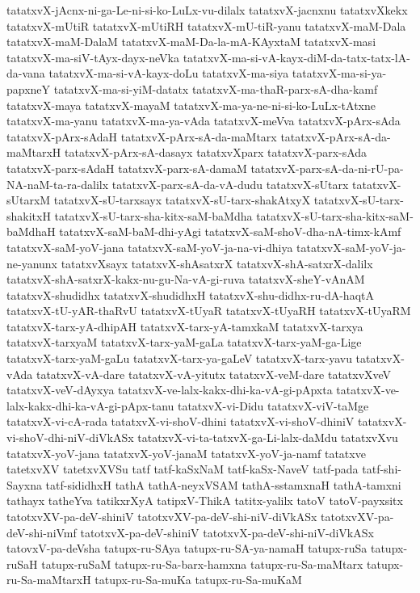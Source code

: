 {tatatxvX-jAcnx-ni-ga-Le-ni-si-ko-LuLx-vu-dilalx
tatatxvX-jacnxnu
tatatxvXkekx
tatatxvX-mUtiR
tatatxvX-mUtiRH
tatatxvX-mU-tiR-yanu
tatatxvX-maM-Dala
tatatxvX-maM-DalaM
tatatxvX-maM-Da-la-mA-KAyxtaM
tatatxvX-masi
tatatxvX-ma-siV-tAyx-dayx-neVka
tatatxvX-ma-si-vA-kayx-diM-da-tatx-tatx-lA-da-vana
tatatxvX-ma-si-vA-kayx-doLu
tatatxvX-ma-siya
tatatxvX-ma-si-ya-papxneY
tatatxvX-ma-si-yiM-datatx
tatatxvX-ma-thaR-parx-sA-dha-kamf
tatatxvX-maya
tatatxvX-mayaM
tatatxvX-ma-ya-ne-ni-si-ko-LuLx-tAtxne
tatatxvX-ma-yanu
tatatxvX-ma-ya-vAda
tatatxvX-meVva
tatatxvX-pArx-sAda
tatatxvX-pArx-sAdaH
tatatxvX-pArx-sA-da-maMtarx
tatatxvX-pArx-sA-da-maMtarxH
tatatxvX-pArx-sA-dasayx
tatatxvXparx
tatatxvX-parx-sAda
tatatxvX-parx-sAdaH
tatatxvX-parx-sA-damaM
tatatxvX-parx-sA-da-ni-rU-pa-NA-naM-ta-ra-dalilx
tatatxvX-parx-sA-da-vA-dudu
tatatxvX-sUtarx
tatatxvX-sUtarxM
tatatxvX-sU-tarxsayx
tatatxvX-sU-tarx-shakAtxyX
tatatxvX-sU-tarx-shakitxH
tatatxvX-sU-tarx-sha-kitx-saM-baMdha
tatatxvX-sU-tarx-sha-kitx-saM-baMdhaH
tatatxvX-saM-baM-dhi-yAgi
tatatxvX-saM-shoV-dha-nA-timx-kAmf
tatatxvX-saM-yoV-jana
tatatxvX-saM-yoV-ja-na-vi-dhiya
tatatxvX-saM-yoV-ja-ne-yanunx
tatatxvXsayx
tatatxvX-shAsatxrX
tatatxvX-shA-satxrX-dalilx
tatatxvX-shA-satxrX-kakx-nu-gu-Na-vA-gi-ruva
tatatxvX-sheY-vAnAM
tatatxvX-shudidhx
tatatxvX-shudidhxH
tatatxvX-shu-didhx-ru-dA-haqtA
tatatxvX-tU-yAR-thaRvU
tatatxvX-tUyaR
tatatxvX-tUyaRH
tatatxvX-tUyaRM
tatatxvX-tarx-yA-dhipAH
tatatxvX-tarx-yA-tamxkaM
tatatxvX-tarxya
tatatxvX-tarxyaM
tatatxvX-tarx-yaM-gaLa
tatatxvX-tarx-yaM-ga-Lige
tatatxvX-tarx-yaM-gaLu
tatatxvX-tarx-ya-gaLeV
tatatxvX-tarx-yavu
tatatxvX-vAda
tatatxvX-vA-dare
tatatxvX-vA-yitutx
tatatxvX-veM-dare
tatatxvXveV
tatatxvX-veV-dAyxya
tatatxvX-ve-lalx-kakx-dhi-ka-vA-gi-pApxta
tatatxvX-ve-lalx-kakx-dhi-ka-vA-gi-pApx-tanu
tatatxvX-vi-Didu
tatatxvX-viV-taMge
tatatxvX-vi-cA-rada
tatatxvX-vi-shoV-dhini
tatatxvX-vi-shoV-dhiniV
tatatxvX-vi-shoV-dhi-niV-diVkASx
tatatxvX-vi-ta-tatxvX-ga-Li-lalx-daMdu
tatatxvXvu
tatatxvX-yoV-jana
tatatxvX-yoV-janaM
tatatxvX-yoV-ja-namf
tatatxve
tatetxvXV
tatetxvXVSu
tatf
tatf-kaSxNaM
tatf-kaSx-NaveV
tatf-pada
tatf-shi-Sayxna
tatf-sididhxH
tathA
tathA-neyxVSAM
tathA-sstamxnaH
tathA-tamxni
tathayx
tatheYva
tatikxrXyA
tatipxV-ThikA
tatitx-yalilx
tatoV
tatoV-payxsitx
tatotxvXV-pa-deV-shiniV
tatotxvXV-pa-deV-shi-niV-diVkASx
tatotxvXV-pa-deV-shi-niVmf
tatotxvX-pa-deV-shiniV
tatotxvX-pa-deV-shi-niV-diVkASx
tatovxV-pa-deVsha
tatupx-ru-SAya
tatupx-ru-SA-ya-namaH
tatupx-ruSa
tatupx-ruSaH
tatupx-ruSaM
tatupx-ru-Sa-barx-hamxna
tatupx-ru-Sa-maMtarx
tatupx-ru-Sa-maMtarxH
tatupx-ru-Sa-muKa
tatupx-ru-Sa-muKaM
}
